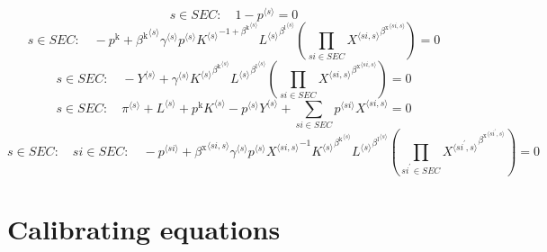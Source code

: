 \begin{equation}
s\in {S\!E\!C}\colon\quad 1 - {p}^{\langle s\rangle} = 0
\end{equation}
\begin{equation}
s\in {S\!E\!C}\colon\quad -p^{\mathrm{k}} + {{\beta^{\mathrm{k}}}^{\langle s\rangle}} {{\gamma}^{\langle s\rangle}} {{p}^{\langle s\rangle}} {{{K}^{\langle s\rangle}}^{-1 + {\beta^{\mathrm{k}}}^{\langle s\rangle}}} {{{L}^{\langle s\rangle}}^{{\beta^{\mathrm{l}}}^{\langle s\rangle}}} \left(\prod_{{s\!i}\in {S\!E\!C}} {{X}^{\langle {s\!i},s\rangle}}^{{\beta^{\mathrm{x}}}^{\langle {s\!i},s\rangle}}\right) = 0
\end{equation}
\begin{equation}
s\in {S\!E\!C}\colon\quad -{Y}^{\langle s\rangle} + {{\gamma}^{\langle s\rangle}} {{{K}^{\langle s\rangle}}^{{\beta^{\mathrm{k}}}^{\langle s\rangle}}} {{{L}^{\langle s\rangle}}^{{\beta^{\mathrm{l}}}^{\langle s\rangle}}} \left(\prod_{{s\!i}\in {S\!E\!C}} {{X}^{\langle {s\!i},s\rangle}}^{{\beta^{\mathrm{x}}}^{\langle {s\!i},s\rangle}}\right) = 0
\end{equation}
\begin{equation}
s\in {S\!E\!C}\colon\quad {\pi}^{\langle s\rangle} + {L}^{\langle s\rangle} + {p^{\mathrm{k}}} {{K}^{\langle s\rangle}} - {{p}^{\langle s\rangle}} {{Y}^{\langle s\rangle}} + \sum_{{s\!i}\in {S\!E\!C}} {{p}^{\langle {s\!i}\rangle}} {{X}^{\langle {s\!i},s\rangle}} = 0
\end{equation}
\begin{equation}
s\in {S\!E\!C}\colon\quad {s\!i}\in {S\!E\!C}\colon\quad -{p}^{\langle {s\!i}\rangle} + {{\beta^{\mathrm{x}}}^{\langle {s\!i},s\rangle}} {{\gamma}^{\langle s\rangle}} {{p}^{\langle s\rangle}} {{X}^{\langle {s\!i},s\rangle}}^{-1} {{{K}^{\langle s\rangle}}^{{\beta^{\mathrm{k}}}^{\langle s\rangle}}} {{{L}^{\langle s\rangle}}^{{\beta^{\mathrm{l}}}^{\langle s\rangle}}} \left(\prod_{{s\!i}^{\prime}\in {S\!E\!C}} {{X}^{\langle {s\!i}^{\prime},s\rangle}}^{{\beta^{\mathrm{x}}}^{\langle {s\!i}^{\prime},s\rangle}}\right) = 0
\end{equation}



\section{Calibrating equations}

